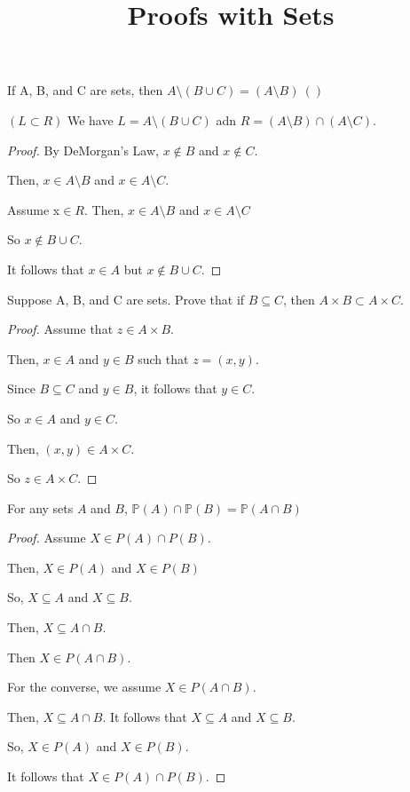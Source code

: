 \documentclass[12pt]{article}
\title{Proofs with Sets}
\date{}
\begin{document}
\maketitle

If A, B, and C are sets, then $A \setminus (B \cup C) = (A \setminus B) \ () $

$(L \subset R)$
We have $L = A \setminus (B \cup C)$ adn $R = (A \setminus B) \cap (A \setminus C)$.

\begin{proof}
    By DeMorgan's Law, $x \notin B$ and $x \notin C$.

    Then, $x \in A \setminus B$ and $x \in A \setminus C$.

    Assume x$ \in R$. Then, $ x \in A \setminus B$ and $x \in A \setminus C$

    So $x \notin B \cup C$.

    It follows that $x \in A$ but $x \notin B \cup C$.
\end{proof}

Suppose A, B, and C are sets. Prove that if $B \subseteq C$, then $A \times B \subset A \times C$.

\begin{proof}
    Assume that $z \in A \times B$.

    Then, $x \in A$ and $y \in B$ such that $z = (x,y)$.

    Since $B \subseteq C$ and $y \in B$, it follows that $y \in C$.

    So $x \in A$ and $y \in C$.

    Then, $(x,y) \in A \times C$.

    So $z \in A \times C$.
\end{proof}

For any sets $A$ and $B$, $\mathbb{P}(A) \cap \mathbb{P}(B) = \mathbb{P}(A \cap B)$

\begin{proof}
    Assume $X \in P(A) \cap P(B)$.

    Then, $X \in P(A)$ and $X \in P(B)$

    So, $X \subseteq A$ and $X \subseteq B$.

    Then, $X \subseteq A \cap B$.

    Then $X \in P(A \cap B)$.

    For the converse, we assume $X \in P(A \cap B)$.

    Then, $X \subseteq A \cap B$. It follows that $X \subseteq A$ and $X \subseteq B$.

    So, $X \in P(A)$ and $X \in P(B)$.

    It follows that $X \in P(A) \cap P(B)$.
\end{proof}
\end{document}
